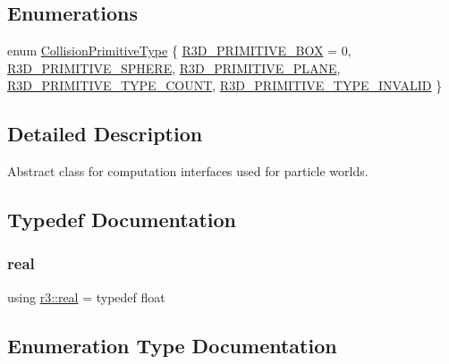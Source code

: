 \subsection*{Enumerations}
\begin{DoxyCompactItemize}
\item 
enum \mbox{\hyperlink{namespacer3_a7079ec5e42c1a55140d3bc093d49e319}{Collision\+Primitive\+Type}} \{ \newline
\mbox{\hyperlink{namespacer3_a7079ec5e42c1a55140d3bc093d49e319ab0db447fd7b2de84191d8b29231a2103}{R3\+D\+\_\+\+P\+R\+I\+M\+I\+T\+I\+V\+E\+\_\+\+B\+OX}} = 0, 
\mbox{\hyperlink{namespacer3_a7079ec5e42c1a55140d3bc093d49e319a287c9eb57336315360581fa6312676b5}{R3\+D\+\_\+\+P\+R\+I\+M\+I\+T\+I\+V\+E\+\_\+\+S\+P\+H\+E\+RE}}, 
\mbox{\hyperlink{namespacer3_a7079ec5e42c1a55140d3bc093d49e319a985a46f234b04b101f07474c97709be7}{R3\+D\+\_\+\+P\+R\+I\+M\+I\+T\+I\+V\+E\+\_\+\+P\+L\+A\+NE}}, 
\mbox{\hyperlink{namespacer3_a7079ec5e42c1a55140d3bc093d49e319aab4ac7e02ac0e76beed256986ef52cea}{R3\+D\+\_\+\+P\+R\+I\+M\+I\+T\+I\+V\+E\+\_\+\+T\+Y\+P\+E\+\_\+\+C\+O\+U\+NT}}, 
\newline
\mbox{\hyperlink{namespacer3_a7079ec5e42c1a55140d3bc093d49e319af4fa492ea93899254dd76639bbc4f30a}{R3\+D\+\_\+\+P\+R\+I\+M\+I\+T\+I\+V\+E\+\_\+\+T\+Y\+P\+E\+\_\+\+I\+N\+V\+A\+L\+ID}}
 \}
\end{DoxyCompactItemize}


\subsection{Detailed Description}
Abstract class for computation interfaces used for particle worlds. 

\subsection{Typedef Documentation}
\mbox{\label{namespacer3_ab2016b3e3f743fb735afce242f0dc1eb}} 
\subsubsection{\texorpdfstring{real}{real}}
{\footnotesize\ttfamily using \mbox{\hyperlink{namespacer3_ab2016b3e3f743fb735afce242f0dc1eb}{r3\+::real}} = typedef float}



\subsection{Enumeration Type Documentation}
\mbox{\label{namespacer3_a7079ec5e42c1a55140d3bc093d49e319}} 
